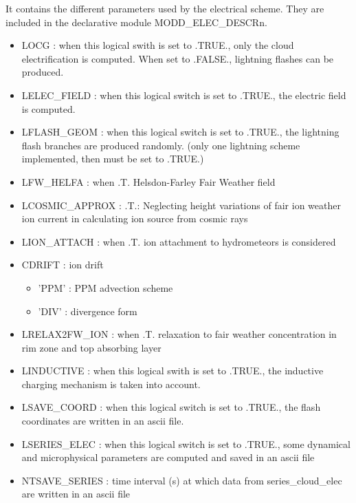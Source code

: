 

It contains the different parameters used by the electrical scheme. 
They are included in the declarative module MODD\_ELEC\_DESCRn.

\begin{itemize}
  \item LOCG : when this logical swith is set to .TRUE., only the cloud electrification is computed. When set to .FALSE., lightning flashes can be produced.
  \item LELEC\_FIELD  : when this logical switch is set to .TRUE., the electric field is computed.
  \item LFLASH\_GEOM : when this logical switch is set to .TRUE., the lightning flash branches are produced randomly. (only one lightning scheme implemented, then must be set to .TRUE.)
  \item LFW\_HELFA : when .T. Helsdon-Farley Fair Weather field
  \item LCOSMIC\_APPROX  : .T.: Neglecting height variations of fair ion weather ion current in calculating ion source from cosmic rays
  \item LION\_ATTACH : when .T. ion attachment to hydrometeors is considered
  \item CDRIFT : ion drift
    \begin{itemize}
     \item 'PPM' : PPM advection scheme
     \item 'DIV' : divergence form
    \end{itemize}
  \item LRELAX2FW\_ION : when .T. relaxation to fair weather concentration in rim zone and top absorbing layer
  \item LINDUCTIVE : when this logical swith is set to .TRUE., the inductive charging mechanism is taken into account.
  \item LSAVE\_COORD : when this logical switch is set to .TRUE., the flash coordinates are written in an ascii file.
  \item LSERIES\_ELEC : when this logical switch is set to .TRUE., some dynamical and microphysical parameters are computed and saved in an ascii file
  \item NTSAVE\_SERIES : time interval (s) at which data from series\_cloud\_elec are written in an ascii file

\end{itemize}
